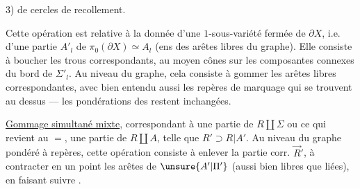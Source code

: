
3)   de cercles de recollement.

Cette opération est relative à la donnée d'une $1$-sous-variété fermée de $\partial X$, i.e. d'une partie $A'_l$ de $\pi_0(\partial X)\simeq A_l$ (ens des arêtes libres du graphe). Elle consiste à boucher les trous correspondants, au moyen  cônes sur les composantes connexes du bord de $\Sigma'_l$. Au niveau du graphe, cela consiste à gommer les arêtes libres correspondantes, avec bien entendu aussi les repères de marquage qui se trouvent au dessus ---  les pondérations des  restent inchangées.

 \uline{Gommage simultané mixte},  correspondant à une partie    de $R\amalg\Sigma$       ou ce qui revient au $=$, une partie  de $R\amalg A$, telle que $R'\supset R|A'$. Au niveau du graphe pondéré à repères, cette opération consiste à enlever   la partie corr. $\vec R'$, à contracter en un point les arêtes de $\unsure{A'|\Pi'}$ (aussi bien libres que liées), en faisant suivre .


